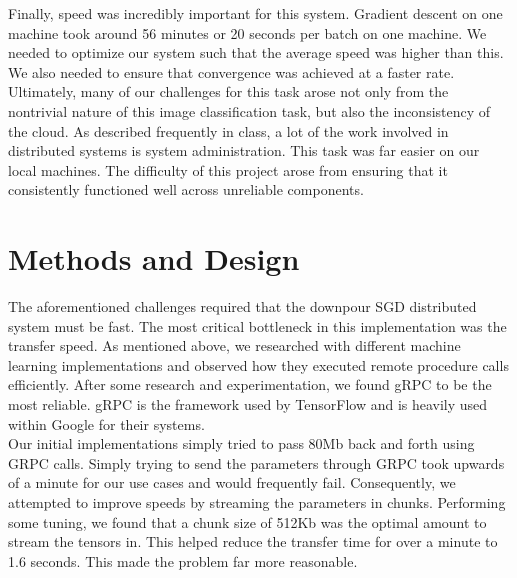\documentclass[11pt]{article}
\begin{document}
\noindent Finally, speed was incredibly important for this system. Gradient descent on one machine took around 56 minutes or 20 seconds per batch on one machine. We needed to optimize our system such that the average speed was higher than this. We also needed to ensure that convergence was achieved at a faster rate. \\

\noindent Ultimately, many of our challenges for this task arose not only from the nontrivial nature of this image classification task, but also the inconsistency of the cloud. As described frequently in class, a lot of the work involved in distributed systems is system administration. This task was far easier on our local machines. The difficulty of this project arose from ensuring that it consistently functioned well across unreliable components.

\section{Methods and Design}

The aforementioned challenges required that the downpour SGD distributed system must be fast. The most critical bottleneck in this implementation was the transfer speed. As mentioned above, we researched with different machine learning implementations and observed how they executed remote procedure calls efficiently. After some research and experimentation, we found gRPC to be the most reliable. gRPC is the framework used by TensorFlow and is heavily used within Google for their systems. \\

\noindent Our initial implementations simply tried to pass 80Mb back and forth using GRPC calls. Simply trying to send the parameters through GRPC took upwards of a minute for our use cases and would frequently fail. Consequently, we attempted to improve speeds by streaming the parameters in chunks. Performing some tuning, we found that a chunk size of 512Kb was the optimal amount to stream the tensors in. This helped reduce the transfer time for over a minute to 1.6 seconds. This made the problem far more reasonable.\\
\end{document}
